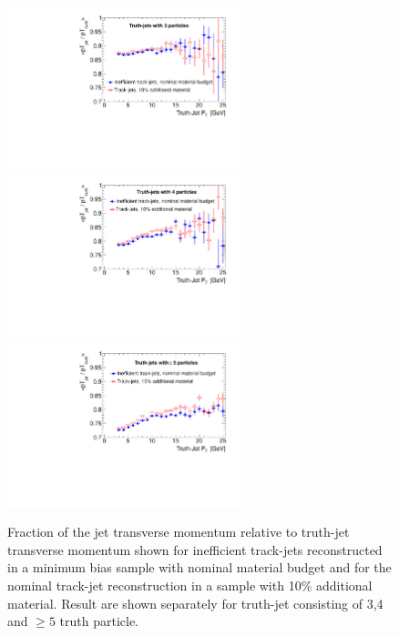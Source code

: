\begin{figure}[tp]
\centering
\includegraphics[width=0.60\textwidth]{figure/trackjet/T7/inef_10cent_pt_3S.pdf}
\includegraphics[width=0.60\textwidth]{figure/trackjet/T7/inef_10cent_pt_4S.pdf}
\includegraphics[width=0.60\textwidth]{figure/trackjet/T7/inef_10cent_pt_5S.pdf}
\caption{Fraction of the jet transverse momentum relative to truth-jet transverse momentum shown for 
	 inefficient track-jets reconstructed in a minimum bias 
	sample with nominal material budget and for the nominal track-jet reconstruction in a sample with 10\% additional material.
	Result are shown separately for truth-jet consisting of 3,4 and $\geq 5$ truth particle.}

\label{fig:tj10tjex_pt}
\end{figure}    
























